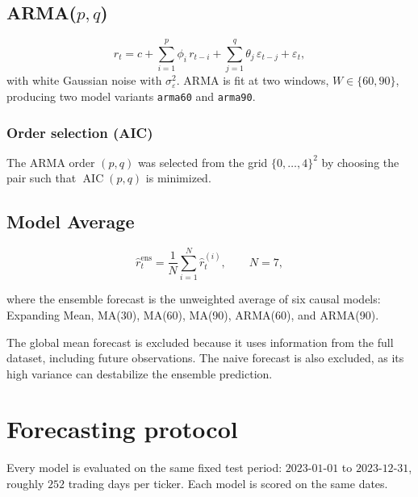 \documentclass[10pt,a4paper,twocolumn]{article}
\DeclareMathOperator{\AIC}{AIC}
\begin{document}
\subsection{ARMA(\texorpdfstring{$p,q$}{p,q})}
\begin{equation}
r_t = c + \sum_{i=1}^{p} \phi_i\,r_{t-i} + \sum_{j=1}^{q} \theta_j\,\varepsilon_{t-j} + \varepsilon_t,
\label{eq:arma-state}
\end{equation}
with white Gaussian noise with $\sigma_\varepsilon^2$. ARMA is fit at two windows, $W \in \{60, 90\}$, producing two model variants \texttt{arma60} and \texttt{arma90}.

\subsubsection*{Order selection (AIC)}

The ARMA order $(p,q)$ was selected from the grid $\{0,\ldots,4\}^2$ by choosing the pair such that $\AIC(p,q)$ is minimized.
\subsection{Model Average}

\begin{equation}
\hat r_t^{\text{ens}} = \frac{1}{N}\sum_{i=1}^{N} \hat r_t^{(i)},
\qquad N = 7,
\label{eq:ens}
\end{equation}

where the ensemble forecast is the unweighted average of six causal models: Expanding Mean, MA(30), MA(60), MA(90), ARMA(60), and ARMA(90).

The global mean forecast is excluded because it uses information from the full dataset, including future observations. 
The naive forecast is also excluded, as its high variance can destabilize the ensemble prediction.

\section{Forecasting protocol}
\label{sec:rolling}

Every model is evaluated on the same fixed test period: $2023$-$01$-$01$ to $2023$-$12$-$31$, roughly $252$ trading days per ticker. Each model is scored on the same dates.
\end{document}
